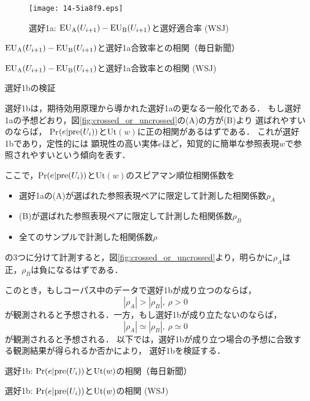 \documentclass[japanese]{jnlp_1.3e}
\renewcommand{\paragraph}{}
\begin{document}
\begin{figure}[t]
\begin{center}
      \texttt{[image: 14-5ia8f9.eps]}
  \caption{選好1a: ${\rm EU_A}(U_{i+1})-{\rm EU_B}(U_{i+1})$と選好適合率 (WSJ)}
  \label{fig:pref1a_eu_wsj}
 \end{center}
\end{figure}
\begin{table}[t]
\caption{${\rm EU_A}(U_{i+1})-{\rm EU_B}(U_{i+1})$と選好1a合致率との相関（毎日新聞）}
\label{tab:pref1a_mainiti}

\end{table}
\begin{table}[t]
\caption{${\rm EU_A}(U_{i+1})-{\rm EU_B}(U_{i+1})$と選好1a合致率との相関 (WSJ)}
\label{tab:pref1a_wsj}

\end{table}


\paragraph{選好1bの検証}

選好1bは，期待効用原理から導かれた選好1aの更なる一般化である．
もし選好1aの予想どおり，図\ref{fig:crossed_or_uncrossed}の(A)の方が(B)より
選ばれやすいのならば，
{\rm Pr$(e|{\rm pre}(U_i))$}と{\rm Ut$(w)$}に正の相関があるはずである．
これが選好1bであり，定性的には
顕現性の高い実体$e$ほど，知覚的に簡単な参照表現$w$で参照されやすいという傾向を表す．

ここで，{\rm Pr$(e|{\rm pre}(U_i))$}と{\rm Ut$(w)$}のスピアマン順位相関係数を
\begin{itemize}
\item 選好1aの(A)が選ばれた参照表現ペアに限定して計測した相関係数$\rho_A$
\item (B)が選ばれた参照表現ペアに限定して計測した相関係数$\rho_B$
\item 全てのサンプルで計測した相関係数$\rho$
\end{itemize}
の3つに分けて計測すると，図\ref{fig:crossed_or_uncrossed}より，明らかに$\rho_A$は正，$\rho_B$は負になるはずである．

このとき，もしコーパス中のデータで選好1bが成り立つのならば，
$$|\rho_A| > |\rho_B|,~\rho > 0$$
が観測されると予想される．一方，もし選好1bが成り立たないのならば，
$$|\rho_A| \simeq |\rho_B|,~\rho \simeq 0$$
が観測されると予想される．
以下では，選好1bが成り立つ場合の予想に合致する観測結果が得られるか否かにより，
選好1bを検証する．

\begin{table}[b]
\caption{選好1b: ${\rm Pr}(e|{\rm pre}(U_i))$と${\rm Ut}(w)$の相関（毎日新聞）}
\label{tab:pref1b_mainiti}

\end{table}
\begin{table}[b]
\caption{選好1b: ${\rm Pr}(e|{\rm pre}(U_i))$と${\rm Ut}(w)$の相関 (WSJ)}
\label{tab:pref1b_wsj}

\end{table}
\end{document}
